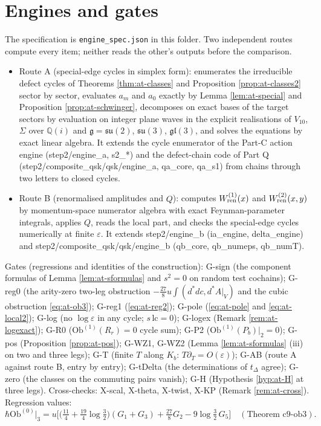 \documentclass[11pt]{article}
\numberwithin{equation}{section}
\theoremstyle{plain}
\theoremstyle{definition}
\newcommand{\AV}{A|_V}
\newcommand{\Ob}{\mathrm{Ob}}
\newcommand{\lc}{\mathrm{lc}}
\begin{document}
\section{Engines and gates}
\label{sec:at-engines}

The specification is \texttt{engine\_spec.json} in this folder. Two independent routes compute every item; neither reads the other's outputs before the comparison.
\begin{itemize}
\item Route A (special-edge cycles in simplex form): enumerates the irreducible defect cycles of Theorems \ref{thm:at-classes} and Proposition \ref{prop:at-classes2} sector by sector, evaluates $a_m$ and $a_0$ exactly by Lemma \ref{lem:at-special} and Proposition \ref{prop:at-schwinger}, decomposes on exact bases of the target sectors by evaluation on integer plane waves in the explicit realisations of $V_{10}$, $\Sigma$ over $\mathbb Q(i)$ and $\mathfrak g=\mathfrak{su}(2)$, $\mathfrak{su}(3)$, $\mathfrak{gl}(3)$, and solves the equations by exact linear algebra. It extends the cycle enumerator of the Part-C action engine (step2/engine\_a, s2\_*) and the defect-chain code of Part Q (step2/composite\_qsk/qsk/engine\_a, qa\_core, qa\_s1) from chains through two letters to closed cycles.
\item Route B (renormalised amplitudes and $Q$): computes $W^{(1)}_{\rm ren}(x)$ and $W^{(2)}_{\rm ren}(x,y)$ by momentum-space numerator algebra with exact Feynman-parameter integrals, applies $Q$, reads the local part, and checks the special-edge cycles numerically at finite $\varepsilon$. It extends step2/engine\_b (ia\_engine, delta\_engine) and step2/composite\_qsk/qsk/engine\_b (qb\_core, qb\_numeps, qb\_numT).
\end{itemize}
Gates (regressions and identities of the construction): G-sign (the component formulas of Lemma \ref{lem:at-sformulas} and $s^2=0$ on random test cochains); G-reg0 (the arity-zero two-leg obstruction $-\tfrac{27}8u\int(d^*dc,d^*\AV)$ and the cubic obstruction \eqref{eq:at-ob3}); G-reg1 (\eqref{eq:at-reg2}); G-pole (\eqref{eq:at-pole} and \eqref{eq:at-local2}); G-log (no $\log\varepsilon$ in any cycle; $s\,\lc=0$); G-logex (Remark \ref{rem:at-logexact}); G-R0 ($\Ob^{(1)}(R_r)=0$ cycle sum); G-P2 ($\Ob^{(1)}(P_b)|_2=0$); G-pos (Proposition \ref{prop:at-pos}); G-WZ1, G-WZ2 (Lemma \ref{lem:at-sformulas} (iii) on two and three legs); G-T (finite $T$ along $K_b$: $T\partial_T=O(\varepsilon)$); G-AB (route A against route B, entry by entry); G-tDelta (the determinations of $t_\Delta$ agree); G-zero (the classes on the commuting pairs vanish); G-H (Hypothesis \ref{hyp:at-H} at three legs). Cross-checks: X-scal, X-theta, X-twist, X-KP (Remark \ref{rem:at-cross}). Regression values:
\begin{equation}
\hbar\Ob^{(0)}\big|_3=u\Big[\big(\tfrac{11}4+\tfrac{19}4\log\tfrac32\big)(G_1+G_3)+\tfrac{27}8G_2-9\log\tfrac32\,G_5\Big]\quad(\text{Theorem c9-ob3}).
\label{eq:at-ob3}
\end{equation}
\end{document}
